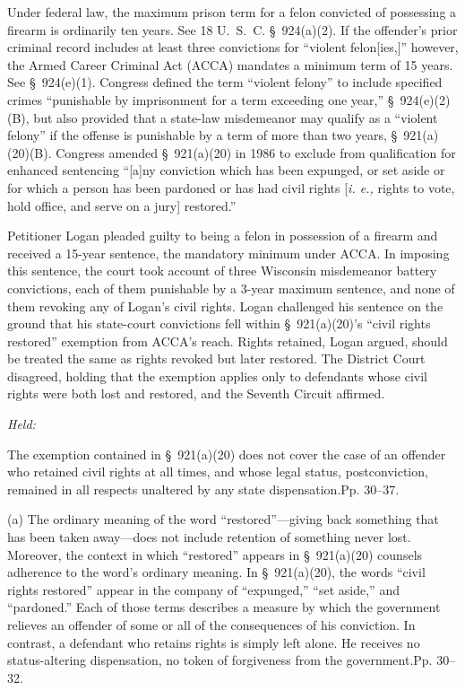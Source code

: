 
\setcounter{page}{23}

  Under federal law, the maximum prison term for a felon convicted of possessing a firearm is ordinarily ten years. See 18 U.~S.~C. \S~924(a)(2). If the offender's prior criminal record includes at least three convictions for ``violent felon[ies,]'' however, the Armed Career Criminal Act (ACCA) mandates a minimum term of 15 years. See \S~924(e)(1). Congress defined the term ``violent felony'' to include specified crimes ``punishable by imprisonment for a term exceeding one year,'' \S~924(e)(2)(B), but also provided that a state-law misdemeanor may qualify as a ``violent felony'' if the offense is punishable by a term of more than two years, \S~921(a)(20)(B). Congress amended \S~921(a)(20) in 1986 to exclude from qualification for enhanced sentencing ``[a]ny conviction which has been expunged, or set aside or for which a person has been pardoned or has had civil rights [\emph{i. e.,} rights to vote, hold office, and serve on a jury] restored.''

  Petitioner Logan pleaded guilty to being a felon in possession of a firearm and received a 15-year sentence, the mandatory minimum under ACCA. In imposing this sentence, the court took account of three Wisconsin misdemeanor battery convictions, each of them punishable by a 3-year maximum sentence, and none of them revoking any of Logan's civil rights. Logan challenged his sentence on the ground that his state-court convictions fell within \S~921(a)(20)'s ``civil rights restored'' exemption from ACCA's reach. Rights retained, Logan argued, should be treated the same as rights revoked but later restored. The District Court disagreed, holding that the exemption applies only to defendants whose civil rights were both lost and restored, and the Seventh Circuit affirmed.

\emph{Held:}

  The exemption contained in \S~921(a)(20) does not cover the case of an offender who retained civil rights at all times, and whose legal status, postconviction, remained in all respects unaltered by any state dispensation.Pp. 30--37.

  (a) The ordinary meaning of the word ``restored''---giving back something that has been taken away---does not include retention of something never lost. Moreover, the context in which ``restored'' appears in \S~921(a)(20) counsels adherence to the word's ordinary meaning. In \S~921(a)(20), the words ``civil rights restored'' appear in the company of \newpage  ``expunged,'' ``set aside,'' and ``pardoned.'' Each of those terms describes a measure by which the government relieves an offender of some or all of the consequences of his conviction. In contrast, a defendant who retains rights is simply left alone. He receives no status-altering dispensation, no token of forgiveness from the government.Pp. 30--32.

